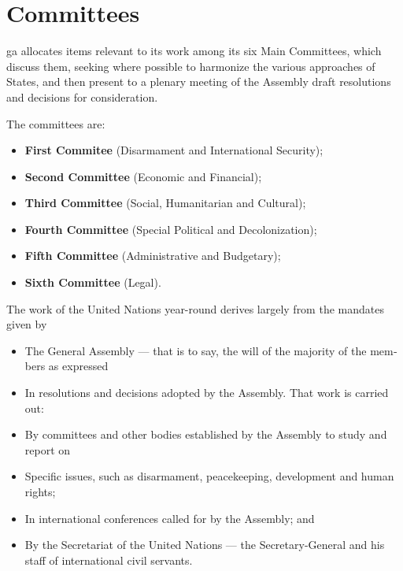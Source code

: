 \section{Committees}

\acrfull{ga} allocates items relevant to its work among its six Main Committees, which discuss them, seeking where possible to harmonize the various approaches of States, and then present to a plenary meeting of the Assembly draft resolutions and decisions for consideration.

The committees are:
\begin{itemize}
	\item \textbf{First Commitee} (Disarmament and International Security);
	\item \textbf{Second Committee} (Economic and Financial);
	\item \textbf{Third Committee} (Social, Humanitarian and Cultural);
	\item \textbf{Fourth Committee} (Special Political and Decolonization);
	\item \textbf{Fifth Committee} (Administrative and Budgetary);
	\item \textbf{Sixth Committee} (Legal).
\end{itemize}

The work of the United Nations year-round derives largely from the mandates given by
\begin{itemize}
	\item The General Assembly — that is to say, the will of the majority of the mem­bers as expressed
	\item In resolutions and decisions adopted by the Assembly. That work is carried out:
	\item By committees and other bodies established by the Assembly to study and report on
	\item Specific issues, such as disarmament, peacekeeping, development and human rights;
	\item In international conferences called for by the Assembly; and
	\item By the Secretariat of the United Nations — the Secretary-General and his staff of international civil servants.
\end{itemize}
